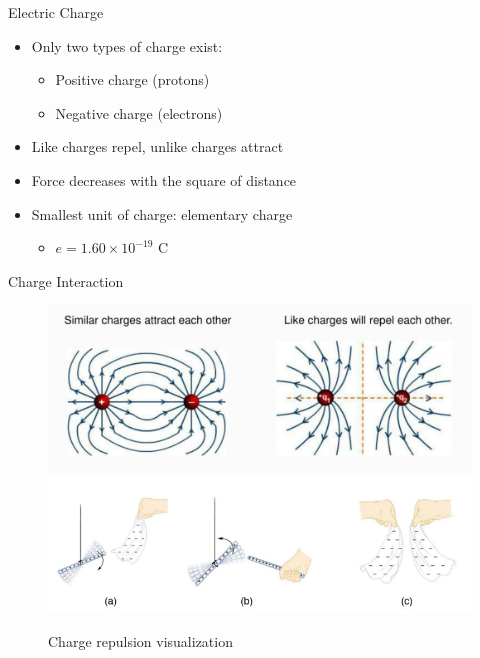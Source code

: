 \documentclass{beamer}
\newcommand{\highlight}[1]{\textcolor{ds9red}{#1}}
\begin{document}
\begin{frame}{Electric Charge}
 
        \begin{itemize}
            \item Only \highlight{two types of charge} exist:
                \begin{itemize}
                    \item Positive charge (protons)
                    \item Negative charge (electrons)
                \end{itemize}
            \item \highlight{Like charges repel}, \highlight{unlike charges attract}
            \item Force decreases with the \highlight{square of distance}
            \item Smallest unit of charge: \highlight{elementary charge}
                \begin{itemize}
                    \item $e = 1.60 \times 10^{-19}$ C
                \end{itemize}
        \end{itemize}

\end{frame}

\begin{frame}{Charge Interaction}
    
        \centering
        \begin{figure}
            \centering
            \includegraphics[width=0.9\linewidth]{repellines.png}
            \vspace{0.5cm}
            \includegraphics[width=0.9\linewidth]{repel.png}
            \caption{Charge repulsion visualization}
        \end{figure}
\end{frame}
\end{document}
